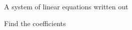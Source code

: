 \documentclass{ximera}
\begin{document}
A system of linear equations written out

Find the coefficients
\end{document}
